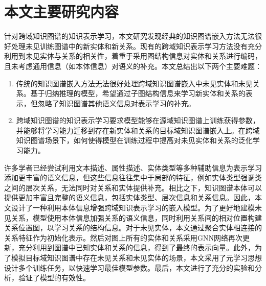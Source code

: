 \section{本文主要研究内容}
针对跨域知识图谱的知识表示学习，本文研究发现经典的知识图谱嵌入方法无法很好处理未见训练图谱中的新实体和新关系。现有的跨域知识表示学习方法没有充分利用到未见实体与关系的相关性，着重于采用图结构信息对实体和关系进行编码，且未考虑通用信息（如本体信息）对语义的补充。本文总结出以下两个主要难题：

\begin{enumerate}[label=\arabic*)]
  \item 传统的知识图谱嵌入方法无法很好处理跨域知识图谱嵌入中未见实体和未见关系。基于归纳推理的模型，希望通过子图结构信息来学习新实体和关系的表示，但忽略了知识图谱其他语义信息对表示学习的补充。

  \item 跨域知识图谱的知识表示学习要求模型能够在源域知识图谱上训练获得参数，并能够将学习能力迁移到存在新实体和关系的目标域知识图谱嵌入上。在跨域知识图谱场景下，如何使得模型在训练过程中提高对未见实体和关系的泛化学习能力。
\end{enumerate}



许多学者已经尝试利用文本描述、属性描述、实体类型等多种辅助信息为表示学习添加更丰富的语义信息，但这些信息往往集中于局部的特征，例如实体类型强调类之间的层次关系，无法同时对关系和实体提供补充。相比之下，知识图谱本体可以提供更加丰富且完整的语义信息，包括实体类型、层次信息和关系信息。因此，本文设计了一种利用本体信息增强跨域知识表示学习的嵌入模型。为了更好地建模未见关系，模型使用本体信息加强关系的语义信息，同时利用关系间的相对位置构建关系位置图，以学习关系的结构信息。对于未见实体，本文通过聚合实体相连接的关系特征作为初始化表示。然后对图上所有的实体和关系采用GNN网络再次更新，充分利用到图谱中已知实体和关系的信息，得到了最终的表示向量。此外，为了模拟目标域知识图谱中存在未见关系和未见实体的场景，本文采用了元学习思想设计多个训练任务，以快速学习最佳模型参数。最后，本文进行了充分的实验和分析，验证了模型的有效性。

